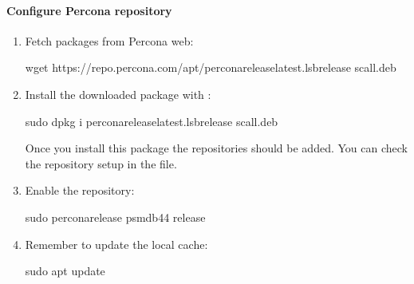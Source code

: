 \documentclass[letterpaper,10pt,english]{sphinxmanual}
\begin{document}
\paragraph{Configure Percona repository}
\label{\detokenize{install/apt:configure-percona-repository}}\begin{enumerate}
%
\item {} 
\sphinxAtStartPar
Fetch  packages from Percona web:

\begin{sphinxVerbatim}[commandchars=\\\{\}]
\PYGZdl{} wget https://repo.percona.com/apt/percona\PYGZhy{}release\PYGZus{}latest.lsb\PYGZus{}release \PYGZhy{}sc\PYGZus{}all.deb
\end{sphinxVerbatim}

\item {} 
\sphinxAtStartPar
Install the downloaded package with :

\begin{sphinxVerbatim}[commandchars=\\\{\}]
\PYGZdl{} sudo dpkg \PYGZhy{}i percona\PYGZhy{}release\PYGZus{}latest.lsb\PYGZus{}release \PYGZhy{}sc\PYGZus{}all.deb
\end{sphinxVerbatim}

\sphinxAtStartPar
Once you install this package the  repositories should be added. You
can check the repository setup in the
 file.

\item {} 
\sphinxAtStartPar
Enable the repository:

\begin{sphinxVerbatim}[commandchars=\\\{\}]
\PYGZdl{} sudo percona\PYGZhy{}release  psmdb\PYGZhy{}44 release
\end{sphinxVerbatim}

\item {} 
\sphinxAtStartPar
Remember to update the local cache:

\begin{sphinxVerbatim}[commandchars=\\\{\}]
\PYGZdl{} sudo apt update
\end{sphinxVerbatim}

\end{enumerate}
\end{document}
